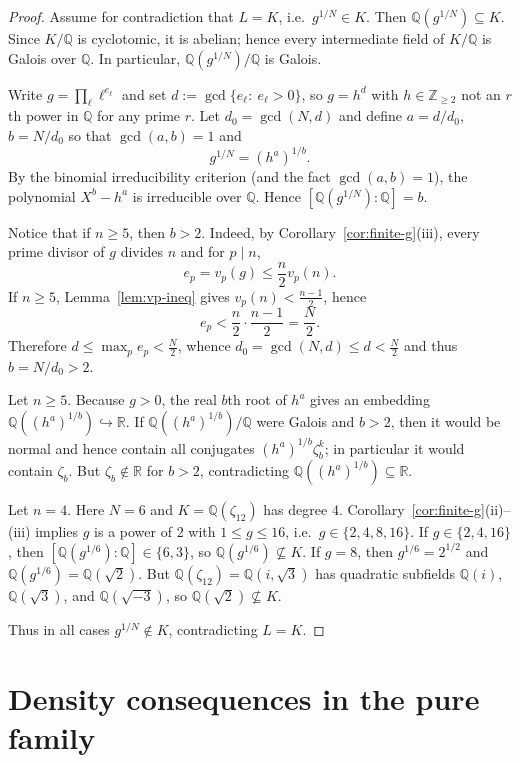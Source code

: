 \documentclass[11pt,letterpaper]{amsart}
\newcommand{\Z}{\mathbb{Z}}
\newcommand{\Q}{\mathbb{Q}}
\newcommand{\R}{\mathbb{R}}
\theoremstyle{plain}
\theoremstyle{definition}
\theoremstyle{remark}
\theoremstyle{plain}
\begin{document}
\begin{proof}
Assume for contradiction that $L=K$, i.e.\ $g^{1/N}\in K$.
Then $\Q(g^{1/N})\subseteq K$.
Since $K/\Q$ is cyclotomic, it is abelian; hence every intermediate field of $K/\Q$ is Galois over $\Q$.
In particular, $\Q(g^{1/N})/\Q$ is Galois.

Write $g=\prod_\ell \ell^{e_\ell}$ and set $d:=\gcd\{e_\ell:\ e_\ell>0\}$, so $g=h^d$ with $h\in\Z_{\ge 2}$
not an $r$th power in $\Q$ for any prime $r$.
Let $d_0=\gcd(N,d)$ and define $a=d/d_0$, $b=N/d_0$ so that $\gcd(a,b)=1$ and
\[
g^{1/N}=(h^a)^{1/b}.
\]
By the binomial irreducibility criterion (and the fact $\gcd(a,b)=1$), the polynomial $X^b-h^a$ is irreducible over $\Q$.
Hence $[\Q(g^{1/N}):\Q]=b$.


Notice that if $n\ge 5$, then $b>2$. Indeed, by Corollary~\ref{cor:finite-g}(iii), every prime divisor of $g$ divides $n$ and for $p\mid n$,
\[
e_p=v_p(g)\le \frac{n}{2}v_p(n).
\]
If $n\ge 5$, Lemma~\ref{lem:vp-ineq} gives $v_p(n)<\frac{n-1}{2}$, hence
\[
e_p<\frac{n}{2}\cdot\frac{n-1}{2}=\frac{N}{2}.
\]
Therefore $d\le \max_p e_p<\frac{N}{2}$, whence $d_0=\gcd(N,d)\le d<\frac{N}{2}$ and thus
$b=N/d_0>2$.

Let $n\ge 5$. Because $g>0$, the real $b$th root of $h^a$ gives an embedding $\Q((h^a)^{1/b})\hookrightarrow\R$. If $\Q((h^a)^{1/b})/\Q$ were Galois and $b>2$, then it would be normal and hence contain all conjugates
$(h^a)^{1/b}\zeta_b^k$; in particular it would contain $\zeta_b$.
But $\zeta_b\notin\R$ for $b>2$, contradicting $\Q((h^a)^{1/b})\subseteq\R$.

Let $n=4$. Here $N=6$ and $K=\Q(\zeta_{12})$ has degree $4$.
Corollary~\ref{cor:finite-g}(ii)--(iii) implies $g$ is a power of $2$ with $1\le g\le 16$, i.e.\ $g\in\{2,4,8,16\}$.
If $g\in\{2,4,16\}$, then $[\Q(g^{1/6}):\Q]\in\{6,3\}$, so $\Q(g^{1/6})\not\subseteq K$.
If $g=8$, then $g^{1/6}=2^{1/2}$ and $\Q(g^{1/6})=\Q(\sqrt2)$.
But $\Q(\zeta_{12})=\Q(i,\sqrt3)$ has quadratic subfields $\Q(i)$, $\Q(\sqrt3)$, and $\Q(\sqrt{-3})$,
so $\Q(\sqrt2)\not\subseteq K$.

Thus in all cases $g^{1/N}\notin K$, contradicting $L=K$.
\end{proof}


\section{Density consequences in the pure family}
\label{sec:density-pure-family}
\end{document}
